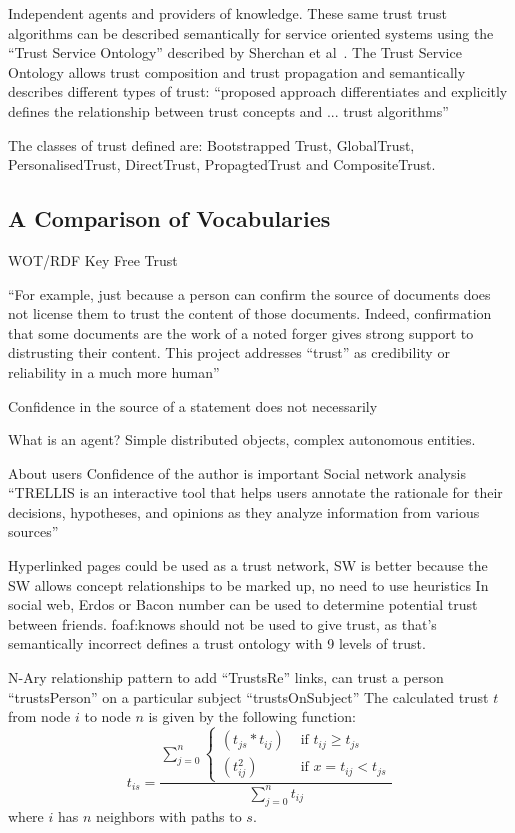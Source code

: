 \documentclass{acm_proc_article-sp}
\begin{document}
Independent agents and providers of knowledge. These same trust trust algorithms can be described semantically for service oriented systems using the ``Trust Service Ontology'' described by Sherchan et al~\cite{sherchan_trust_2010}. The Trust Service Ontology allows trust composition and trust propagation and semantically describes different types of trust: ``proposed approach differentiates and explicitly
defines the relationship between trust concepts and ... trust algorithms''

The classes of trust defined are: Bootstrapped Trust, GlobalTrust, PersonalisedTrust, DirectTrust, PropagtedTrust and CompositeTrust.

\subsection{A Comparison of Vocabularies}
WOT/RDF
Key Free Trust

``For example, just because a person can confirm the source of documents does not license them to trust the content of those documents. Indeed, confirmation that some documents are the work of a noted forger gives strong support to distrusting their content. This project addresses ``trust'' as credibility or reliability in a much more human''

Confidence in the source of a statement does not necessarily 


What is an agent? Simple distributed objects, complex autonomous entities.
\cite{kalfoglou_emergent_2004}

About users
Confidence of the author is important
Social network analysis
``TRELLIS is an interactive tool that helps users annotate the
rationale for their decisions, hypotheses, and opinions as they analyze information from various sources''\cite{gil_trusting_2002}

Hyperlinked pages could be used as a trust network, SW is better because the SW allows concept relationships to be marked up, no need to use heuristics
In social web, Erdos or Bacon number can be used to determine potential trust between friends.
foaf:knows should not be used to give trust, as that's semantically incorrect
defines a trust ontology with 9 levels of trust.

N-Ary relationship pattern to add ``TrustsRe'' links, can trust a person ``trustsPerson'' on a particular subject ``trustsOnSubject''
The calculated trust $t$ from node $i$ to node $n$ is given by the following function:
\begin{equation}
t_{is}=\frac{\sum_{j=0}^{n}{\begin{cases}
(t_{js}*t_{ij}) & \text{ if } t_{ij} \geq t_{js} \\ 
(t_{ij}^2) & \text{ if } x= t_{ij} < t_{js}
\end{cases}}}{\sum_{j=0}^{n}{t_{ij}}}
\end{equation}
where $i$ has $n$ neighbors with paths to $s$.
\end{document}
